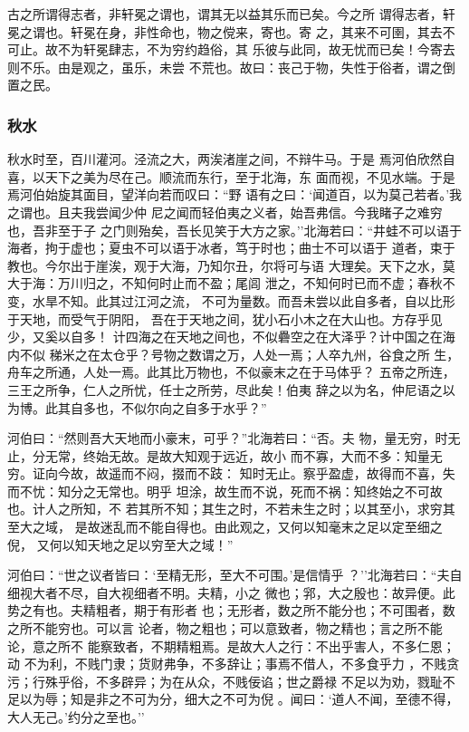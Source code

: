 \documentclass[]{article}
\begin{document}
古之所谓得志者，非轩冕之谓也，谓其无以益其乐而已矣。今之所
谓得志者，轩冕之谓也。轩冕在身，非性命也，物之傥来，寄也。寄
之，其来不可圉，其去不可止。故不为轩冕肆志，不为穷约趋俗，其
乐彼与此同，故无忧而已矣！今寄去则不乐。由是观之，虽乐，未尝
不荒也。故曰：丧己于物，失性于俗者，谓之倒置之民。

\hypertarget{header-n789}{%
\subsubsection{秋水}\label{header-n789}}

秋水时至，百川灌河。泾流之大，两涘渚崖之间，不辩牛马。于是
焉河伯欣然自喜，以天下之美为尽在己。顺流而东行，至于北海，东
面而视，不见水端。于是焉河伯始旋其面目，望洋向若而叹曰：``野
语有之曰：`闻道百，以为莫己若者。'我之谓也。且夫我尝闻少仲
尼之闻而轻伯夷之义者，始吾弗信。今我睹子之难穷也，吾非至于子
之门则殆矣，吾长见笑于大方之家。''北海若曰：``井蛙不可以语于海者，拘于虚也；夏虫不可以语于冰者，笃于时也；曲士不可以语于
道者，束于教也。今尔出于崖涘，观于大海，乃知尔丑，尔将可与语
大理矣。天下之水，莫大于海：万川归之，不知何时止而不盈；尾闾
泄之，不知何时已而不虚；春秋不变，水旱不知。此其过江河之流，
不可为量数。而吾未尝以此自多者，自以比形于天地，而受气于阴阳，
吾在于天地之间，犹小石小木之在大山也。方存乎见少，又奚以自多！
计四海之在天地之间也，不似礨空之在大泽乎？计中国之在海内不似
稊米之在太仓乎？号物之数谓之万，人处一焉；人卒九州，谷食之所
生，舟车之所通，人处一焉。此其比万物也，不似豪末之在于马体乎？
五帝之所连，三王之所争，仁人之所忧，任士之所劳，尽此矣！伯夷
辞之以为名，仲尼语之以为博。此其自多也，不似尔向之自多于水乎？''

河伯曰：``然则吾大天地而小豪末，可乎？''北海若曰：``否。夫
物，量无穷，时无止，分无常，终始无故。是故大知观于远近，故小
而不寡，大而不多：知量无穷。证向今故，故遥而不闷，掇而不跂：
知时无止。察乎盈虚，故得而不喜，失而不忧：知分之无常也。明乎
坦涂，故生而不说，死而不祸：知终始之不可故也。计人之所知，不
若其所不知；其生之时，不若未生之时；以其至小，求穷其至大之域，
是故迷乱而不能自得也。由此观之，又何以知毫末之足以定至细之倪，
又何以知天地之足以穷至大之域！''

河伯曰：``世之议者皆曰：`至精无形，至大不可围。'是信情乎
？''北海若曰：``夫自细视大者不尽，自大视细者不明。夫精，小之
微也；郛，大之殷也：故异便。此势之有也。夫精粗者，期于有形者
也；无形者，数之所不能分也；不可围者，数之所不能穷也。可以言
论者，物之粗也；可以意致者，物之精也；言之所不能论，意之所不
能察致者，不期精粗焉。是故大人之行：不出乎害人，不多仁恩；动
不为利，不贱门隶；货财弗争，不多辞让；事焉不借人，不多食乎力
，不贱贪污；行殊乎俗，不多辟异；为在从众，不贱佞谄；世之爵禄
不足以为劝，戮耻不足以为辱；知是非之不可为分，细大之不可为倪
。闻曰：`道人不闻，至德不得，大人无己。'约分之至也。''
\end{document}
